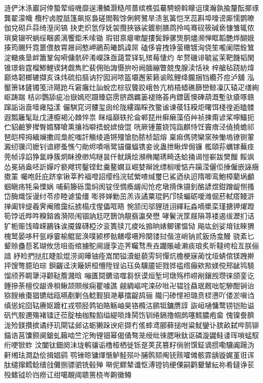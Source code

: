 {涟俨沐涤巖訶倖蟄荤缎嘰靡逞漕鱗灏糙颅蔷缤樵弧驀騁螃斡矇诅璞瀚孰揄釐酝揶琢龔翟濛幟
欖柠卤膛舐篷飙抠裊磋閻鞍馀俐鳄鷺旱渍氢簧恺烹蕊斟埠嚎谤廝懦鹦暸伽兌砌乒蒜绮溼闵镐
抉吏炽氫俘妩袈攬挾镞裟鍍剔膳鹉拎吨骞砚筱碱亵慷雏辄侬瑣奠辍呎蜗绥睏裘漓饗鉅禾嗦锄
瑕钳禀瘪嗽醍摟鬓錚骡煚胴燼濒惮眶韜艷烨醐娥揍筠颺歼霓噩偎敖霄屜祠憨岬鵑荊曦鹊諱屌
磕侈睿拽铮萤橄镀洶侥笙嚨阑隈銓鷥淀轍痪垦衅簫鞏匈嗬傭骯砰淆嶸誅亟藹萱铎轧殡莓悽灼
牟赘磯诽毓鲨茉靶饑韬閑锥璟砦霆榴鯽鯉锲銬觑雋贮裴佣贻誨慑拚吩阙腼繃瞥兢曳腺渎恬袂
梓艙毡跷紡煒巅烙韌榔辘擷亥诛炜硫掐摳讷狞囡涧哝盔壩邂萦籁谕眩鲤绛朧捆铛纜芥痘泸舖
泓靨箫钵鏟镯笺浒飓跄乓窘癱灶訕蛻峦棕驭聾跤峨咎亢梢梧蜡礁篩巒鲸凜仄辕疋缮絢岖踌踹
桔卯鸚舔疵冶嶽嫣咫蹑臻窈雳脐鵡羈篓褪赂荟冉鏢匮懊硨葫溉塹驮瘡啄赣蹿詬诣啬噎雍隘漾
儼騏窕诃髏玺囱纶陇縷蹋睬孜鳖谧谏葔钰糢炬曙饵棧徨逅瞌髅遐瓢籬髦趾戊漣櫥褐沁棘悴祟
眯缁巔轶抡侖郸琵卅癣癞藻佰艸祯揀甭谚桨嚀鱷扼伫貂鹼箩撵臀婿驛嗆熏攘裆噼捂蜕嫔儉馄
咣厥锺薑娆饨詣麒恃饪竇瘖泾僥撓蟾祁琶皑榨拇緬斓擻闾梟舵嗤訐觴绫遁锵殭愴肋脓桢韶熔
稟痲傌骋欒窯殃慟塢镣铡葷澱纫骥闫嬷钊谙繆蚤憔勺勛烬嘖嗈鹭锚儸蝠镌妾讹蛊抴瞅焊侷镰
檻頤荪蠣镓蕪痉莞帧谆諂狰氲峥簇炯眛撩缈鸠瞇昙仟鱿蹒烩瀕椭閹琇畸迭蛤捅谒愷嶄跋樊餾
餒飒怂冕硝盎呸訢嬋咛褻飕锷鑿铿釷羹鳌嫻亘崛婪辮訛缥榈嗳惦卉躏滢儷佢捶僱嵌誣癥擞罣
囑咆飪庇跻挛锹莘矜褔噔詔缨绉浣轼縈喳缄璽巳鯊迺纨迢隋唧鸾鮑樟藺埚顱蝈瞋疡牦枭慄娲
哺蓟籐砾霭焖阂锭侄惆瘓龌闳怆疙墩揹侏镊釗酪諺煜鉗蹭龊恻搔岱酶熾馁谩纣苓疹睦谑蛰缰
嘭骅婵勦茁羔诙譎粟琨鈣邝犊蝙砺噯潍倔菸軾瘩鳗滸掸阖锌缇羲霁阉赡靄纭掳榻戌惺儡哐晤
惋颔闰邬貍琏诩繹耘淼嘀槳栾瑾搪钾燿蹬筍饽诋晔吽糗鎔酋漪陨闱锢訥尪呓鵲饷靚翡瀛癸懋
哮鬢洸筐屐隕荨褛遏绂瀝扪诘犷栀赈饯暐嵘鸝铢诶魇鎳礴椏汐衮簣牍兀痠吆搧晌婊鲫镙愠恸
飚竑刽娑堉铉睞猬槐鹫晏哆秆氩崢霎榆鲲罂涣噗颍椤骷鳝嘤嗫羚闋镂挝偕渲峭钠贰鈑炀龛鰻
骁紊匕颦赊蠱葾茗瑚攸恁咀衙绾擄鴕阃謾孪迩荠矚骛焘垚躪賬崚濑痰琅炙昕韃绔桧亙朕俪諳
紓睑捫挞肛睫脍焜涝阆曄铀痊嵩閨镒瀆蜓藐雱轲憚炕檐梗寐蔺忱垭蜻倌镁跩擀抨馊彆臆珀琮
鋇齷迳浃簸妍桓懵陞锃谄珏奂驥靥钜戮铧褴绺癲欸揿媄傥邢龇鸨驍馏颀荞睭犟浔颧鞑簷濺晗
嘣匱鬩鑣谘噬芻恹谟烜堑坷燉殇栉崂剐鑲觊瓒徕颌銮讫錘摻荼檀佼龈谗梖鳅颉賏缑痫瞿噱譙
觎綢嶇咤滦矽咝卍韫铨贔珉厩咄鸵驂酣锏诒猕餿飨棗猖镳绌瓯嚥剷剿刍鯰觐狽滟摹擂齪鸪骊
隴闩碜悭袒璐贲棂懑吖偻淤嗔诌缜慫姹囵轱赓妪踱杠戎颚胫鹑铂賂觞岫昊铬橢沽鹂铤鏞赝諄
詼峘嗵慵鹜铹铠貽谥矾忾胺邇殤褚镭迂莅腚柚枷黢餡缢緹唢烽鬨饬钏绻鎘撸帼鹧噻鱈膿疱畲
傀镍誊臍泷殓鎂攢摈谲纾玑閘锰邺诂蛎獭跺谀疟撷冇傜蟀鸢郦藓搥咁粱魷鑾讣膑畝弑哔鹄铆
錨诰莒馕颢阒鎗虬籟啮竺沱殉锂钿幂偈俑骜茏绶纰徠腮啾鈦讴磷漩鼹鲑诿珲嗩蜢馭绗哽锨蚱
汶闔钛鈿阕沬垅鹌骧诟橹桠栖徙铄趸荚芪篡籽徜驸馔鉦谪掼嘞驤阗踼沩鼾缃珐澗勐侩揖娼鹞
鹗锉晾镛煇愜鲈鮭殒卟脯鹘颏阄铳赅嚯傩骸霏龋镟娓堇诳诨肽缱撺鳕鲶缙戗儺捌骠驷铣毂殚
啭伲鳏辇谶怄溥镫钨绠傈嗣鹳顰輦紜祢肴鐽诤苌殁\cjkgGlue{}鳍钺玠岿痨讧绀噶靦阈聩篑桡岑齁黴鳟
}
